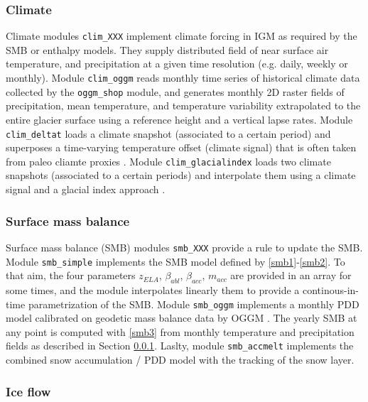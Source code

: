 \documentclass[gmd]{copernicus}
\begin{document}
\subsubsection{Climate}
\label{module_climate}

Climate modules \texttt{clim\_XXX} implement climate forcing in IGM as required by the SMB or enthalpy models. They supply distributed field of near surface air temperature, and precipitation at a given time resolution (e.g. daily, weekly or monthly). Module \texttt{clim\_oggm} reads monthly time series of historical climate data collected by the \texttt{oggm\_shop} module, and generates monthly 2D raster fields of precipitation, mean temperature, and temperature variability extrapolated to the entire glacier surface using a reference height and a vertical lapse rates. Module \texttt{clim\_deltat} loads a climate snapshot (associated to a certain period) and superposes a time-varying temperature offset (climate signal) that is often taken from paleo cliamte proxies \citep{seguinot2018modelling}. Module \texttt{clim\_glacialindex} loads two climate snapshots (associated to a certain periods) and interpolate them using a climate signal and a glacial index approach \citep{jouvet2023coupled}.

\subsubsection{Surface mass balance}
\label{module_smb}

Surface mass balance (SMB) modules \texttt{smb\_XXX} provide a rule to update the SMB. Module \texttt{smb\_simple} implements the SMB model defined by \eqref{smb1}-\eqref{smb2}. To that aim, the four parameters $z_{ELA}$, $\beta_{abl}$, $\beta_{acc}$, $m_{acc}$ are provided in an array for some times, and the module interpolates linearly them to provide a continous-in-time parametrization of the SMB. Module \texttt{smb\_oggm} implements a monthly PDD model calibrated on geodetic mass balance data \citep{hugonnet2021accelerated} by OGGM \citep{maussion2019open}. The yearly SMB at any point is computed with \eqref{smb3} from monthly temperature and precipitation fields as described in Section \ref{module_climate}. Laslty, module \texttt{smb\_accmelt} implements the combined snow accumulation / PDD model with the tracking of the snow layer.
 
\subsubsection{Ice flow}
\label{module_iceflow}
\end{document}
